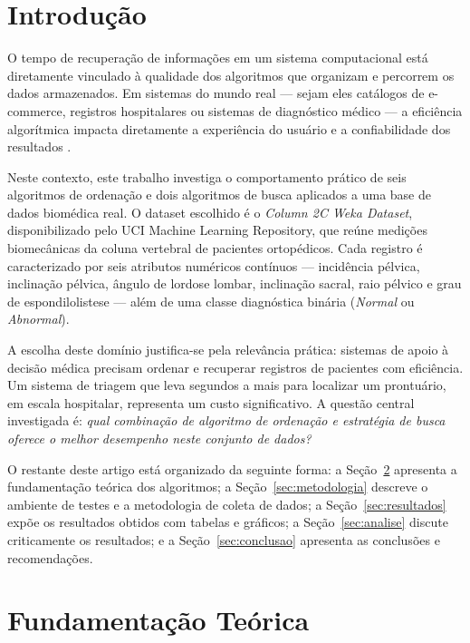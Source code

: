 \documentclass[12pt]{article}
\begin{document}
\section{Introdução}

O tempo de recuperação de informações em um sistema computacional está diretamente vinculado à qualidade dos algoritmos que organizam e percorrem os dados armazenados. Em sistemas do mundo real --- sejam eles catálogos de e-commerce, registros hospitalares ou sistemas de diagnóstico médico --- a eficiência algorítmica impacta diretamente a experiência do usuário e a confiabilidade dos resultados \cite{ziviani2005}.

Neste contexto, este trabalho investiga o comportamento prático de seis algoritmos de ordenação e dois algoritmos de busca aplicados a uma base de dados biomédica real. O dataset escolhido é o \textit{Column 2C Weka Dataset}, disponibilizado pelo UCI Machine Learning Repository, que reúne medições biomecânicas da coluna vertebral de pacientes ortopédicos. Cada registro é caracterizado por seis atributos numéricos contínuos --- incidência pélvica, inclinação pélvica, ângulo de lordose lombar, inclinação sacral, raio pélvico e grau de espondilolistese --- além de uma classe diagnóstica binária (\textit{Normal} ou \textit{Abnormal}).

A escolha deste domínio justifica-se pela relevância prática: sistemas de apoio à decisão médica precisam ordenar e recuperar registros de pacientes com eficiência. Um sistema de triagem que leva segundos a mais para localizar um prontuário, em escala hospitalar, representa um custo significativo. A questão central investigada é: \textit{qual combinação de algoritmo de ordenação e estratégia de busca oferece o melhor desempenho neste conjunto de dados?}

O restante deste artigo está organizado da seguinte forma: a Seção~\ref{sec:fundamentacao} apresenta a fundamentação teórica dos algoritmos; a Seção~\ref{sec:metodologia} descreve o ambiente de testes e a metodologia de coleta de dados; a Seção~\ref{sec:resultados} expõe os resultados obtidos com tabelas e gráficos; a Seção~\ref{sec:analise} discute criticamente os resultados; e a Seção~\ref{sec:conclusao} apresenta as conclusões e recomendações.

\section{Fundamentação Teórica}
\label{sec:fundamentacao}
\end{document}
